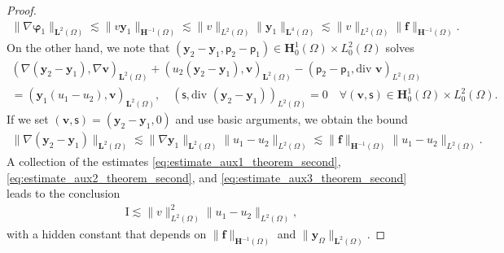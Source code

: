 \documentclass[final]{siamart0216}
\begin{document}
\begin{proof}
\begin{align}\label{eq:estimate_aux2_theorem_second}
\|\nabla\boldsymbol{\varphi}_1\|_{\mathbf{L}^{2}(\Omega)}
\lesssim 
\|v \mathbf{y}_1\|_{\mathbf{H}^{-1}(\Omega)}
\lesssim \|v\|_{L^2(\Omega)} \|\mathbf{y}_1\|_{\mathbf{L}^{4}(\Omega)}
\lesssim \|v\|_{L^2(\Omega)}\|\mathbf{f}\|_{\mathbf{H}^{-1}(\Omega)}.
\end{align}
On the other hand, we note that $(\mathbf{y}_2-\mathbf{y}_1,\mathsf{p}_2-\mathsf{p}_1)\in\mathbf{H}_0^1(\Omega)\times L_0^2(\Omega)$ solves
\begin{multline*}
(\nabla (\mathbf{y}_2-\mathbf{y}_1),\nabla \mathbf{v})_{\mathbf{L}^2(\Omega)}+( u_2(\mathbf{y}_2-\mathbf{y}_1), \mathbf{v})_{\mathbf{L}^2(\Omega)}-(\mathsf{p}_2-\mathsf{p}_1,\text{div }\mathbf{v})_{L^2(\Omega)} \\
= (\mathbf{y}_1(u_1-u_2),\mathbf{v})_{\mathbf{L}^2(\Omega)},
\quad
(\mathsf{s},\text{div }(\mathbf{y}_2-\mathbf{y}_1))_{L^2(\Omega)}  =  0
\quad
\forall (\mathbf{v},\mathsf{s}) \in \mathbf{H}_0^1(\Omega) \times L_0^2(\Omega).
\end{multline*}
If we set $(\mathbf{v},\mathsf{s}) = (\mathbf{y}_2-\mathbf{y}_1,0)$ and use basic arguments, we obtain the bound
\begin{multline}\label{eq:estimate_aux3_theorem_second}
\|\nabla(\mathbf{y}_2-\mathbf{y}_1)\|_{\mathbf{L}^{2}(\Omega)}
\lesssim 
\|\nabla\mathbf{y}_1\|_{\mathbf{L}^{2}(\Omega)} \|u_1-u_2\|_{L^2(\Omega)}
\lesssim 
\|\mathbf{f}\|_{\mathbf{H}^{-1}(\Omega)}
\|u_1-u_2\|_{L^2(\Omega)}.
\end{multline} 
A collection of the estimates \eqref{eq:estimate_aux1_theorem_second}, \eqref{eq:estimate_aux2_theorem_second}, and \eqref{eq:estimate_aux3_theorem_second} leads to the conclusion
\begin{align}\label{eq:I_estimates}
\text{I}\lesssim\|v\|^2_{L^2(\Omega)}\|u_1-u_2\|_{L^2(\Omega)},
\end{align}
with a hidden constant that depends on $\|\mathbf{f}\|_{\mathbf{H}^{-1}(\Omega)}$ and $\|\mathbf{y}_\Omega\|_{\mathbf{L}^2(\Omega)}$. 


\end{proof}
\end{document}
